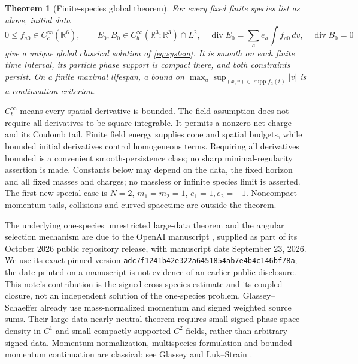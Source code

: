 \documentclass[11pt]{article}
\newcommand{\R}{\mathbb R}
\newcommand{\supp}{\operatorname{supp}}
\newcommand{\diver}{\operatorname{div}}
\newtheorem{theorem}{Theorem}[section]
\theoremstyle{remark}\newtheorem{remark}[theorem]{Remark}
\numberwithin{equation}{section}
\begin{document}
\begin{theorem}[Finite-species global theorem]\label{thm:main}
For every fixed finite species list as above, initial data
\begin{equation}\label{eq:data}
 0\le f_{a0}\in C_c^\infty(\R^6),\qquad
 E_0,B_0\in C_b^\infty(\R^3;\R^3)\cap L^2,
 \quad\diver E_0=\sum_a e_a\int f_{a0}\,dv,\quad\diver B_0=0
\end{equation}
give a unique global classical solution of \eqref{eq:system}. It is smooth on
each finite time interval, its particle phase support is compact there,
and both constraints persist. On a finite maximal lifespan, a bound on
$\max_a\sup_{(x,v)\in\supp f_a(t)}|v|$ is a continuation criterion.
\end{theorem}

$C_b^\infty$ means every spatial derivative is bounded. The field assumption
does not require all derivatives to be square integrable. It permits a nonzero
net charge and its Coulomb tail. Finite field energy supplies cone and
spatial budgets, while bounded initial derivatives control homogeneous terms.
Requiring all derivatives bounded is a convenient smooth-persistence class;
no sharp minimal-regularity assertion is made. Constants below may depend on the data,
the fixed horizon and all fixed masses and charges; no massless or infinite
species limit is asserted. The first new special case is $N=2$,
$m_1=m_2=1$, $e_1=1,e_2=-1$. Noncompact momentum tails, collisions and curved
spacetime are outside the theorem.

The underlying one-species unrestricted large-data theorem and the angular
selection mechanism are due to the OpenAI manuscript \cite{OAI362}, supplied
as part of its October 2026 public repository release, with manuscript date
September 23, 2026. We use its exact pinned version
\texttt{adc7f1241b42e322a6451854ab7e4b4c146bf78a}; the date printed on a
manuscript is not evidence of an earlier public disclosure. This note's
contribution is the signed cross-species estimate and its coupled closure,
not an independent solution of the one-species problem. Glassey--Schaeffer
\cite{GlasseySchaeffer1988} already use mass-normalized momentum and signed
weighted source sums. Their large-data nearly-neutral theorem requires small
signed phase-space density in $C^1$ and small compactly supported $C^2$
fields, rather than arbitrary signed data. Momentum normalization,
multispecies formulation and bounded-momentum continuation are classical;
see Glassey \cite{Glassey} and Luk--Strain \cite{LukStrain}.
\end{document}
